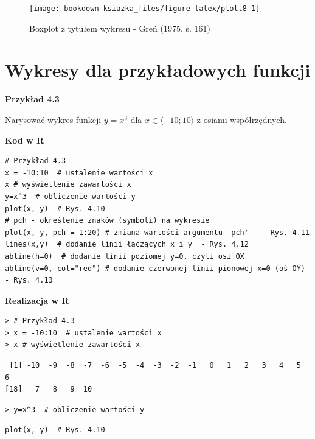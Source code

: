 \documentclass[12pt,B5paper,]{book}
\begin{document}
\begin{figure}[H]

{\centering \texttt{[image: bookdown-ksiazka\_files/figure-latex/plott8-1]} 

}

\caption{Boxplot z tytułem wykresu - Greń (1975, s. 161)}\label{fig:plott8}
\end{figure}

\section{Wykresy dla przykładowych
funkcji}\label{wykresy-dla-przykadowych-funkcji}

\vspace{0.8cm} \textbf{Przykład 4.3}

Narysować wykres funkcji \(y=x^3\) dla \(x \in \langle -10;10 \rangle\)
z osiami współrzędnych.

\vspace{0.8cm} \textbf{Kod w R}

\begin{verbatim}
# Przykład 4.3
x = -10:10  # ustalenie wartości x
x # wyświetlenie zawartości x
y=x^3  # obliczenie wartości y
plot(x, y)  # Rys. 4.10
# pch - określenie znaków (symboli) na wykresie
plot(x, y, pch = 1:20) # zmiana wartości argumentu 'pch'  -  Rys. 4.11
lines(x,y)  # dodanie linii łączących x i y  - Rys. 4.12
abline(h=0)  # dodanie linii poziomej y=0, czyli osi OX
abline(v=0, col="red") # dodanie czerwonej linii pionowej x=0 (oś OY)  - Rys. 4.13
\end{verbatim}

\vspace{0.8cm} \textbf{Realizacja w R}

\begin{verbatim}
> # Przykład 4.3
> x = -10:10  # ustalenie wartości x
> x # wyświetlenie zawartości x
\end{verbatim}

\begin{verbatim}
 [1] -10  -9  -8  -7  -6  -5  -4  -3  -2  -1   0   1   2   3   4   5   6
[18]   7   8   9  10
\end{verbatim}

\begin{verbatim}
> y=x^3  # obliczenie wartości y
\end{verbatim}

\begin{verbatim}
plot(x, y)  # Rys. 4.10
\end{verbatim}
\end{document}
